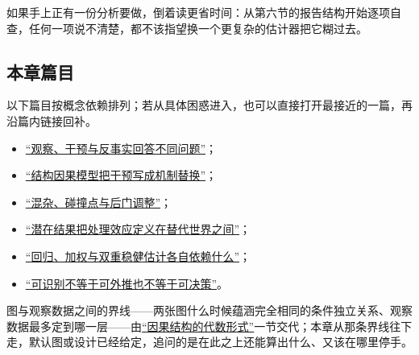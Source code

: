 如果手上正有一份分析要做，倒着读更省时间：从第六节的报告结构开始逐项自查，任何一项说不清楚，都不该指望换一个更复杂的估计器把它糊过去。

\subsection{本章篇目}

以下篇目按概念依赖排列；若从具体困惑进入，也可以直接打开最接近的一篇，再沿篇内链接回补。

\begin{itemize}
\tightlist
\item \hyperref[sec:13-Machine-Learning/12-Causal-Inference/01]{``观察、干预与反事实回答不同问题''}；
\item \hyperref[sec:13-Machine-Learning/12-Causal-Inference/02]{``结构因果模型把干预写成机制替换''}；
\item \hyperref[sec:13-Machine-Learning/12-Causal-Inference/03]{``混杂、碰撞点与后门调整''}；
\item \hyperref[sec:13-Machine-Learning/12-Causal-Inference/04]{``潜在结果把处理效应定义在替代世界之间''}；
\item \hyperref[sec:13-Machine-Learning/12-Causal-Inference/05]{``回归、加权与双重稳健估计各自依赖什么''}；
\item \hyperref[sec:13-Machine-Learning/12-Causal-Inference/06]{``可识别不等于可外推也不等于可决策''}。
\end{itemize}

图与观察数据之间的界线——两张图什么时候蕴涵完全相同的条件独立关系、观察数据最多定到哪一层——由\hyperref[sec:12-Real-Analysis-Support/10-Essential-Structures/04]{``因果结构的代数形式''}一节交代；本章从那条界线往下走，默认图或设计已经给定，追问的是在此之上还能算出什么、又该在哪里停手。
